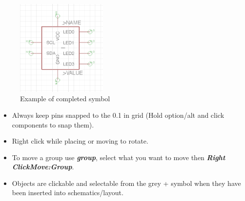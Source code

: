 \documentclass{article}
\begin{document}
\begin{figure}[!h]
    \center
    \includegraphics[width=0.4\textwidth,height=0.4\textheight,keepaspectratio]{symbol}
    \caption {Example of completed symbol}
    \label{img:symbol}
\end{figure}

\begin{tcolorbox} [title=Tips \& Tricks]
    \begin{itemize}
        \item Always keep pins snapped to the 0.1 in grid (Hold option/alt and click components to snap them).
        \item Right click while placing or moving to rotate.
        \item To move a group use \textit{\textbf{group}}, select what you want to move then \textit{\textbf{Right Click\textrightarrow Move:Group}}.
        \item Objects are clickable and selectable from the grey + symbol when they have been inserted into schematics/layout.
    \end{itemize}
\end{tcolorbox}
\end{document}

